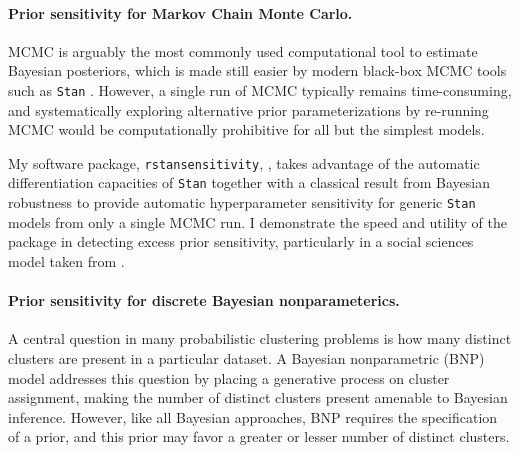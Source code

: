 \paragraph{Prior sensitivity for Markov Chain Monte Carlo.}

MCMC is arguably the most commonly used computational tool to estimate Bayesian
posteriors, which is made still easier by modern black-box MCMC tools such as
\texttt{Stan} \citep{carpenter:2017:stan, rstan}.  However, a single run of MCMC
typically remains time-consuming, and systematically exploring alternative prior
parameterizations by re-running MCMC would be computationally prohibitive for
all but the simplest models.

My software package, \texttt{rstansensitivity},
\citep{giordano:2020:rstansensitivity, giordano:2018:mcmchyper}, takes advantage
of the automatic differentiation capacities of \texttt{Stan}
\citep{carpenter:2015:stanmath} together with a classical result from  Bayesian
robustness \citep{gustafson:1996:localposterior, basu:1996:local,
giordano:2018:covariances} to provide automatic hyperparameter sensitivity for
generic \texttt{Stan} models from only a single MCMC run.  I demonstrate the
speed and utility of the package in detecting excess prior sensitivity,
particularly in a social sciences model taken from \citet[Chapter
13.5]{gelman:2006:arm}.


\paragraph{Prior sensitivity for discrete Bayesian nonparameterics.}

A central question in many probabilistic clustering problems is how many
distinct clusters are present in a particular dataset. A Bayesian nonparametric
(BNP) model addresses this question by placing a generative process on cluster
assignment, making the number of distinct clusters present amenable to Bayesian
inference.  However, like all Bayesian approaches, BNP requires the
specification of a prior, and this prior may favor a greater or lesser number of
distinct clusters.

